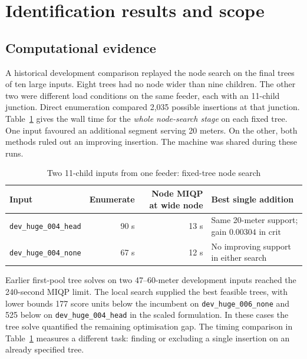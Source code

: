 \documentclass[journal,onecolumn,11pt]{IEEEtran}
\begin{document}
\section{Identification results and scope}\label{sec:tests}\label{sec:value}

\subsection{Computational evidence}
A historical development comparison replayed the node search on the final trees of ten large inputs. Eight trees
had no node wider than nine children. The other two were different load conditions on the same feeder, each
with an 11-child junction. Direct enumeration compared 2,035 possible insertions at that junction.
Table~\ref{tab:wide} gives the wall time for the \emph{whole node-search stage} on each fixed tree.
One input favoured an additional segment serving 20 meters. On the other, both methods ruled out an improving
insertion. The machine was shared during these runs.

\begin{table}[htbp]
\caption{Two 11-child inputs from one feeder: fixed-tree node search}\label{tab:wide}
\centering
\begin{tabular}{@{}lrrl@{}}
\toprule
Input & Enumerate & Node MIQP at wide node & Best single addition\\
\midrule
\texttt{dev\_huge\_004\_head} & 90 s & 13 s & Same 20-meter support; gain $0.00304$ in $\mathrm{crit}$\\
\texttt{dev\_huge\_004\_none} & 67 s & 12 s & No improving support in either search\\
\bottomrule
\end{tabular}
\end{table}

Earlier first-pool tree solves on two 47--60-meter development inputs reached the 240-second MIQP limit.
The local search supplied the best feasible trees, with lower bounds 177 score units below the incumbent on
\texttt{dev\_huge\_006\_none} and 525 below on \texttt{dev\_huge\_004\_head} in the scaled formulation. In these cases the tree solve quantified the remaining optimisation gap.
The timing comparison in Table~\ref{tab:wide} measures a different task: finding or excluding a single insertion
on an already specified tree.
\end{document}
